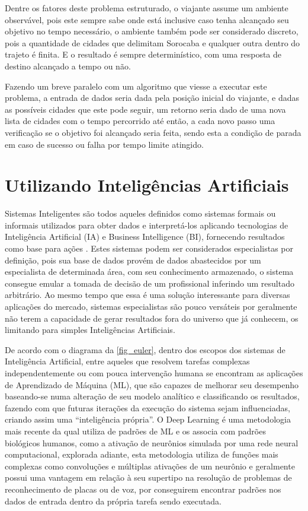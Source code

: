 Dentre os fatores deste problema estruturado, o viajante assume um
ambiente observável, pois este sempre sabe onde está inclusive caso
tenha alcançado seu objetivo no tempo necessário, o ambiente também
pode ser considerado discreto, pois a quantidade de cidades que
delimitam Sorocaba e qualquer outra dentro do trajeto é finita. E o
resultado é sempre determinístico, com uma resposta de destino
alcançado a tempo ou não.

Fazendo um breve paralelo com um algoritmo que viesse a executar este
problema, a entrada de dados seria dada pela posição inicial do
viajante, e dadas as possíveis cidades que este pode seguir, um
retorno seria dado de uma nova lista de cidades com o tempo percorrido
até então, a cada novo passo uma verificação se o objetivo foi
alcançado seria feita, sendo esta a condição de parada em caso de
sucesso ou falha por tempo limite atingido.

\section{Utilizando Intelig{\^e}ncias Artificiais}

Sistemas Inteligentes são todos aqueles definidos como sistemas
formais ou informais utilizados para obter dados e interpretá-los
aplicando tecnologias de Inteligência Artificial (IA) e Business
Intelligence (BI), fornecendo resultados como base para ações
\cite{sharda2017}. Estes sistemas podem ser considerados especialistas
por definição, pois sua base de dados provém de dados abastecidos por
um especialista de determinada área, com seu conhecimento armazenado,
o sistema consegue emular a tomada de decisão de um profissional
inferindo um resultado arbitrário. Ao mesmo tempo que essa é uma
solução interessante para diversas aplicações do mercado, sistemas
especialistas são pouco versáteis por geralmente não terem a
capacidade de gerar resultados fora do universo que já conhecem, os
limitando para simples Inteligências Artificiais.

De acordo com o diagrama da \autoref{fig_euler}, dentro dos escopos
dos sistemas de Inteligência Artificial, entre aqueles que resolvem
tarefas complexas independentemente ou com pouca intervenção humana
\cite{russel2020} se encontram as aplicações de Aprendizado de Máquina
(ML), que são capazes de melhorar seu desempenho baseando-se numa
alteração de seu modelo analítico e classificando os resultados,
fazendo com que futuras iterações da execução do sistema sejam
influenciadas, criando assim uma “inteligência própria”. O Deep
Learning é uma metodologia mais recente da qual utiliza de padrões de
ML e os associa com padrões biológicos humanos, como a ativação de
neurônios simulada por uma rede neural computacional, explorada
adiante, esta metodologia utiliza de funções mais complexas como
convoluções e múltiplas ativações de um neurônio \cite{janiesch2021} e
geralmente possui uma vantagem em relação à seu supertipo na resolução
de problemas de reconhecimento de placas ou de voz, por conseguirem
encontrar padrões nos dados de entrada dentro da própria tarefa sendo
executada.

